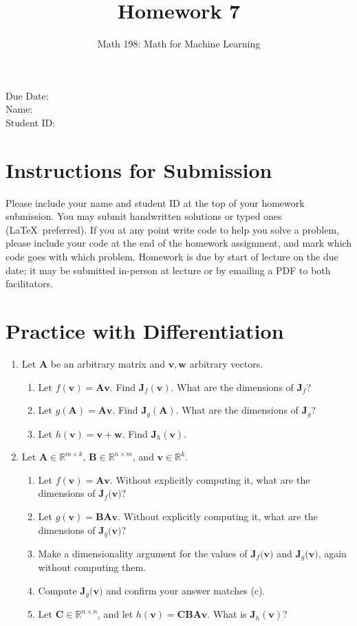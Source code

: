 \documentclass{article}
\title{Homework 7}
\author{Math 198: Math for Machine Learning}
\date{}
\begin{document}
\maketitle

\noindent
Due Date:  \\
Name: \\
Student ID:

\section*{Instructions for Submission}
Please include your name and student ID at the top of your homework submission. You may submit handwritten solutions or typed ones (\LaTeX\ preferred). If you at any point write code to help you solve a problem, please include your code at the end of the homework assignment, and mark which code goes with which problem. Homework is due by start of lecture on the due date; it may be submitted in-person at lecture or by emailing a PDF to both facilitators.

\section{Practice with Differentiation}
\begin{enumerate}[label=\arabic*.]
\item Let $\mathbf{A}$ be an arbitrary matrix and $\mathbf{v}, \mathbf{w}$ arbitrary vectors.
	\begin{enumerate}[label=(\alph*)]
	\item Let $f(\mathbf{v}) = \mathbf{Av}$. Find $\mathbf{J}_{f}(\mathbf{v})$. What are the dimensions of $\mathbf{J}_f$?
	\item Let $g(\mathbf{A}) = \mathbf{Av}$. Find $\mathbf{J}_{g}(\mathbf{A})$. What are the dimensions of $\mathbf{J}_g$?
	\item Let $h(\mathbf{v}) = \mathbf{v + w}$. Find $\mathbf{J}_{h}(\mathbf{v})$.
	\end{enumerate}
\item Let $\mathbf{A} \in \mathbb{R}^{m \times k}$, $\mathbf{B} \in \mathbb{R}^{n \times m}$, and $\mathbf{v} \in \mathbb{R}^k$.
	\begin{enumerate}[label=(\alph*)]
	\item Let $f(\mathbf{v}) = \mathbf{Av}$. Without explicitly computing it, what are the dimensions of $\mathbf{J}_f(\mathbf{v)}$?
	\item Let $g(\mathbf{v}) = \mathbf{BAv}$. Without explicitly computing it, what are the dimensions of $\mathbf{J}_g(\mathbf{v)}$?
	\item Make a dimensionality argument for the values of $\mathbf{J}_f(\mathbf{v)}$ and $\mathbf{J}_g(\mathbf{v)}$, again without computing them.
	\item Compute $\mathbf{J}_g(\mathbf{v)}$ and confirm your answer matches (c).
	\item Let $\mathbf{C} \in \mathbb{R}^{n \times n}$, and let $h(\mathbf{v}) = \mathbf{CBAv}$. What is $\mathbf{J}_h(\mathbf{v})$?
	\end{enumerate}
\end{enumerate}
\end{document}
